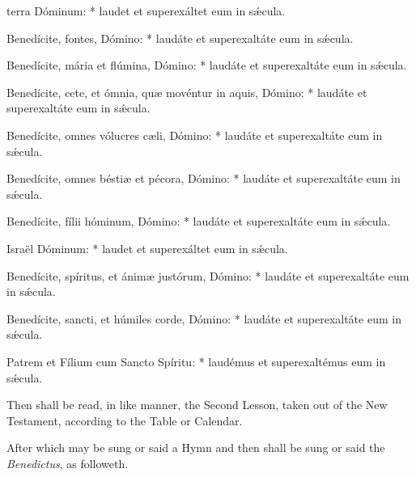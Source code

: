  terra Dóminum: * laudet et superexáltet eum in sǽcula.\par
{}
Benedícite, fontes, Dómino: * laudáte et superexaltáte eum in sǽcula.\par
Benedícite, mária et flúmina, Dómino: * laudáte et superexaltáte eum in sǽcula.\par
Benedícite, cete, et ómnia, qu{\ae} movéntur in aquis, Dómino: * laudáte et superexaltáte eum in sǽcula.\par
Benedícite, omnes vólucres c{\ae}li, Dómino: * laudáte et superexaltáte eum in sǽcula.\par
Benedícite, omnes bésti{\ae} et pécora, Dómino: * laudáte et superexaltáte eum in sǽcula.\par
Benedícite, fílii hóminum, Dómino: * laudáte et superexaltáte eum in sǽcula.\par
{} Israël Dóminum: * laudet et superexáltet eum in sǽcula.\par
{}
Benedícite, spíritus, et ánim{\ae} justórum, Dómino: * laudáte et superexaltáte eum in sǽcula.\par
Benedícite, sancti, et húmiles corde, Dómino: * laudáte et superexaltáte eum in sǽcula.\par
{} Patrem et Fílium cum Sancto Spíritu: * laudémus et superexaltémus eum in sǽcula.

\begin{rubric}
    {Then shall be read, in like manner, the Second Lesson, taken out of the New Testament, according to the Table or Calendar.}
\end{rubric}

\label{Benedictus}

\vspace{-2ex}

\begin{rubric}
    After which may be sung or said a Hymn and then shall be sung or said the \emph{Benedictus}, as followeth.
\end{rubric}

